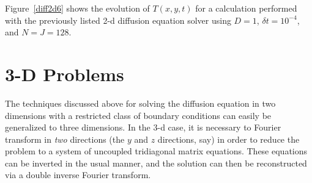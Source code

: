 Figure~\ref{diff2d6} shows the evolution of $T(x,y,t)$ for a calculation performed
with the previously listed 2-d diffusion equation solver 
using $D=1$, $\delta t = 10^{-4}$, and $N=J=128$.

\section{3-D Problems}
The techniques discussed above for solving
the diffusion equation in two dimensions with a restricted class of boundary conditions can easily
be generalized to three dimensions. In the 3-d case, it is necessary to Fourier
transform in {\em two} directions (the $y$ and $z$ directions, say) in order to reduce the
problem to a system of uncoupled tridiagonal matrix equations. These equations can be inverted
in the usual manner, and the solution can then be reconstructed via a double inverse Fourier
transform.